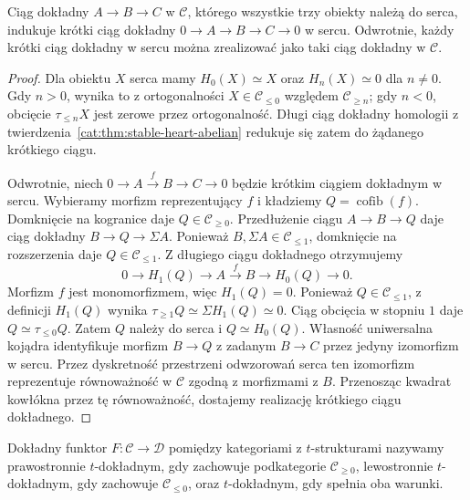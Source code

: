 \begin{stwierdzenie}\label{cat:prop:stable-heart-short-exact}
Ciąg dokładny $A\to B\to C$ w $\mathcal C$, którego wszystkie trzy obiekty należą do serca, indukuje krótki ciąg dokładny $0\to A\to B\to C\to0$ w sercu. Odwrotnie, każdy krótki ciąg dokładny w sercu można zrealizować jako taki ciąg dokładny w $\mathcal C$.
\end{stwierdzenie}
\begin{proof}
Dla obiektu $X$ serca mamy $H_0(X)\simeq X$ oraz $H_n(X)\simeq0$ dla $n\ne0$. Gdy $n>0$, wynika to z ortogonalności $X\in\mathcal C_{\leq0}$ względem $\mathcal C_{\geq n}$; gdy $n<0$, obcięcie $\tau_{\leq n}X$ jest zerowe przez ortogonalność. Długi ciąg dokładny homologii z twierdzenia~\ref{cat:thm:stable-heart-abelian} redukuje się zatem do żądanego krótkiego ciągu.

Odwrotnie, niech $0\to A\xrightarrow{f}B\to C\to0$ będzie krótkim ciągiem dokładnym w sercu. Wybieramy morfizm reprezentujący $f$ i kładziemy $Q=\operatorname{cofib}(f)$. Domknięcie na kogranice daje $Q\in\mathcal C_{\geq0}$. Przedłużenie ciągu $A\to B\to Q$ daje ciąg dokładny $B\to Q\to\Sigma A$. Ponieważ $B,\Sigma A\in\mathcal C_{\leq1}$, domknięcie na rozszerzenia daje $Q\in\mathcal C_{\leq1}$. Z długiego ciągu dokładnego otrzymujemy
\[
 0\longrightarrow H_1(Q)\longrightarrow A
 \xrightarrow{f}B\longrightarrow H_0(Q)\longrightarrow0.
\]
Morfizm $f$ jest monomorfizmem, więc $H_1(Q)=0$. Ponieważ $Q\in\mathcal C_{\leq1}$, z definicji $H_1(Q)$ wynika $\tau_{\geq1}Q\simeq\Sigma H_1(Q)\simeq0$. Ciąg obcięcia w stopniu $1$ daje $Q\simeq\tau_{\leq0}Q$. Zatem $Q$ należy do serca i $Q\simeq H_0(Q)$. Własność uniwersalna kojądra identyfikuje morfizm $B\to Q$ z zadanym $B\to C$ przez jedyny izomorfizm w sercu. Przez dyskretność przestrzeni odwzorowań serca ten izomorfizm reprezentuje równoważność w $\mathcal C$ zgodną z morfizmami z $B$. Przenosząc kwadrat kowłókna przez tę równoważność, dostajemy realizację krótkiego ciągu dokładnego.
\end{proof}

\begin{definicja}\label{cat:def:stable-t-exact}
Dokładny funktor $F:\mathcal C\to\mathcal D$ pomiędzy kategoriami z $t$-strukturami nazywamy prawostronnie $t$-dokładnym, gdy zachowuje podkategorie $\mathcal C_{\geq0}$, lewostronnie $t$-dokładnym, gdy zachowuje $\mathcal C_{\leq0}$, oraz $t$-dokładnym, gdy spełnia oba warunki.
\end{definicja}

